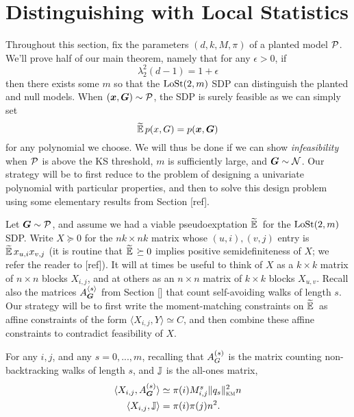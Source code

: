 \section{Distinguishing with Local Statistics}    \label{sec:algo}

Throughout this section, fix the parameters $(d,k,M,\pi)$ of a planted model $\mathcal{P}$. We'll prove half of our main theorem, namely that for any $\epsilon > 0$, if
$$
    \lambda_2^2(d-1) = 1 + \epsilon
$$
then there exists some $m$ so that the $\operatorname{LoSt}(2,m)$ SDP can distinguish the planted and null models. When $({\boldsymbol{x}},\boldsymbol{G}) \sim \mathcal{P}$, the SDP is surely feasible as we can simply set
$$
    \widetilde{\operatorname*{\mathbb{E}}}\, p(x,G) = p({\boldsymbol{x}},\boldsymbol{G})
$$
for any polynomial we choose. We will thus be done if we can show \textit{infeasibility} when $\mathcal{P}$ is above the KS threshold, $m$ is sufficiently large, and $\boldsymbol{G}\sim \mathcal{N}$. Our strategy will be to first reduce to the problem of designing a univariate polynomial with particular properties, and then to solve this design problem using some elementary results from Section [ref].

Let $\boldsymbol{G} \sim \mathcal{P}$, and assume we had a viable pseudoexptation $\widetilde{\operatorname*{\mathbb{E}}}\,$ for the $\operatorname{LoSt}(2,m)$ SDP. Write $X \succeq 0$ for the $nk\times nk$ matrix whose $(u,i),(v,j)$ entry is $\widetilde{\operatorname*{\mathbb{E}}}\, x_{u,i}x_{v,j}$ (it is routine that $\widetilde{\operatorname*{\mathbb{E}}}\, \succeq 0$ implies positive semidefiniteness of $X$; we refer the reader to [ref]). It will at times be useful to think of $X$ as a $k\times k$ matrix of $n\times n$ blocks $X_{i,j}$, and at others as an $n\times n$ matrix of $k\times k$ blocks $X_{u,v}$. Recall also the matrices $A^{\langle s \rangle}_{\boldsymbol{G}}$ from Section [] that count self-avoiding walks of length $s$. Our strategy will be to first write the moment-matching constraints on $\widetilde{\operatorname*{\mathbb{E}}}\,$ as affine constraints of the form $\langle X_{i,j}, Y \rangle \simeq C$, and then combine these affine constraints to contradict feasibility of $X$.

\begin{lemma}
    For any $i,j$, and any $s = 0,...,m$, recalling that $A^{(s)}_{G}$ is the matrix counting non-backtracking walks of length $s$, and $\mathbb{J}$ is the all-ones matrix,
    \begin{align*}
        \langle X_{i,j}, A^{(s)}_{\boldsymbol{G}} \rangle &\simeq \pi(i) M_{i,j}^s \|q_s\|^2_{\textsc{km}} n \\
        \langle X_{i,j}, \mathbb{J} \rangle &= \pi(i)\pi(j)n^2.
    \end{align*}
\end{lemma}

